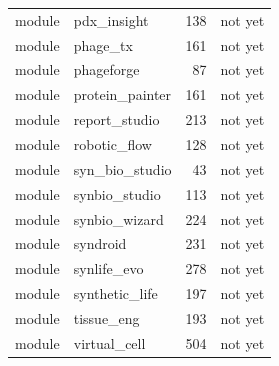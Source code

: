 \begin{center}
\begin{longtable}{llrl}
module & pdx\_insight & 138 & not yet\\
module & phage\_tx & 161 & not yet\\
module & phageforge & 87 & not yet\\
module & protein\_painter & 161 & not yet\\
module & report\_studio & 213 & not yet\\
module & robotic\_flow & 128 & not yet\\
module & syn\_bio\_studio & 43 & not yet\\
module & synbio\_studio & 113 & not yet\\
module & synbio\_wizard & 224 & not yet\\
module & syndroid & 231 & not yet\\
module & synlife\_evo & 278 & not yet\\
module & synthetic\_life & 197 & not yet\\
module & tissue\_eng & 193 & not yet\\
module & virtual\_cell & 504 & not yet\\
\hline\end{longtable}\end{center}
